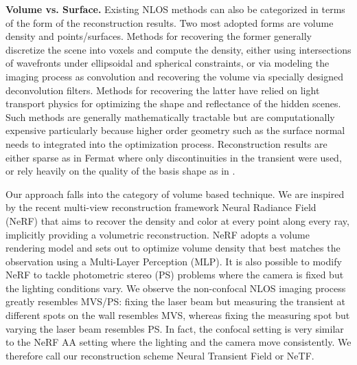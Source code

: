 \documentclass[10pt,journal,compsoc]{IEEEtran}
\begin{document}


\textbf{Volume vs. Surface.} Existing NLOS methods can also be categorized in terms of the form of the reconstruction results. Two most adopted forms are volume density and points/surfaces. Methods for recovering the former generally discretize the scene into voxels and compute the density, either using intersections of wavefronts under ellipsoidal \cite{2012Velten, 2012Gupta, 2015Mauro, 2015Gariepy, 2017Victor, 2019Ahn, 2019Manna} and spherical \cite{2018LCT, 2020DLCT} constraints, or via modeling the imaging process as convolution and recovering the volume via specially designed deconvolution filters. Methods for recovering the latter have relied on light transport physics \cite{2019Tsai, 2020ToG} for optimizing the shape and reflectance of the hidden scenes. Such methods are generally mathematically tractable but are computationally expensive particularly because higher order geometry such as the surface normal needs to integrated into the optimization process. Reconstruction results are either sparse as in Fermat \cite{2019Xin} where only discontinuities in the transient were used, or rely heavily on the quality of the basis shape as in \cite{2019Tsai}.

Our approach falls into the category of volume based technique. We are inspired by the recent multi-view reconstruction framework Neural Radiance Field (NeRF) that aims to recover the density and color at every point along every ray, implicitly providing a volumetric reconstruction. NeRF adopts a volume rendering model and sets out to optimize volume density that best matches the observation using a Multi-Layer Perception (MLP). It is also possible to modify NeRF to tackle photometric stereo (PS) problems where the camera is fixed but the lighting conditions vary. We observe the non-confocal NLOS imaging process greatly resembles MVS/PS: fixing the laser beam but measuring the transient at different spots on the wall resembles MVS, whereas fixing the measuring spot but varying the laser beam resembles PS. In fact, the confocal setting is very similar to the NeRF AA setting \cite{bi2020neural} where the lighting and the camera move consistently. We therefore call our reconstruction scheme Neural Transient Field or NeTF.
\end{document}
